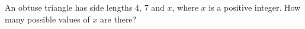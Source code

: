 An obtuse triangle has side lengths $4$, $7$ and $x$, where $x$ is a positive integer. How many possible values of $x$ are there?
